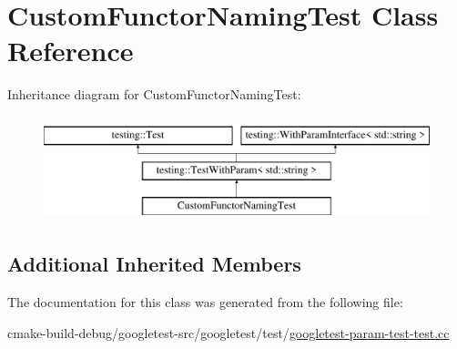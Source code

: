 \hypertarget{classCustomFunctorNamingTest}{}\section{Custom\+Functor\+Naming\+Test Class Reference}
\label{classCustomFunctorNamingTest}
Inheritance diagram for Custom\+Functor\+Naming\+Test\+:\begin{figure}[H]
\begin{center}
\leavevmode
\includegraphics[height=3.000000cm]{classCustomFunctorNamingTest}
\end{center}
\end{figure}
\subsection*{Additional Inherited Members}


The documentation for this class was generated from the following file\+:\begin{DoxyCompactItemize}
\item 
cmake-\/build-\/debug/googletest-\/src/googletest/test/\mbox{\hyperlink{googletest-param-test-test_8cc}{googletest-\/param-\/test-\/test.\+cc}}\end{DoxyCompactItemize}
